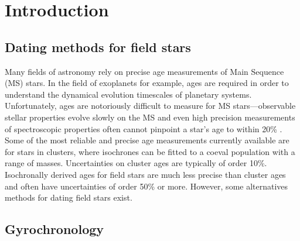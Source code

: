 \documentclass[10pt,preprint]{aastex}
\begin{document}
\section{Introduction}
\label{intro}
\subsection{Dating methods for field stars}

Many fields of astronomy rely on precise age measurements of Main Sequence (MS) stars.
In the field of exoplanets for example, ages are required in order to understand the dynamical evolution timescales of planetary systems.
Unfortunately, ages are notoriously difficult to measure for MS stars---observable stellar properties evolve slowly on the MS and even high precision measurements of spectroscopic properties often cannot pinpoint a star's age to within 20\% \citep{Soderblom2010}.
Some of the most reliable and precise age measurements currently available are for stars in clusters, where isochrones can be fitted to a coeval population with a range of masses.
Uncertainties on cluster ages are typically of order 10\%.
Isochronally derived ages for field stars are much less precise than cluster ages and often have uncertainties of order 50\% or more.
However, some alternatives methods for dating field stars exist.


\subsection{Gyrochronology}
\end{document}
